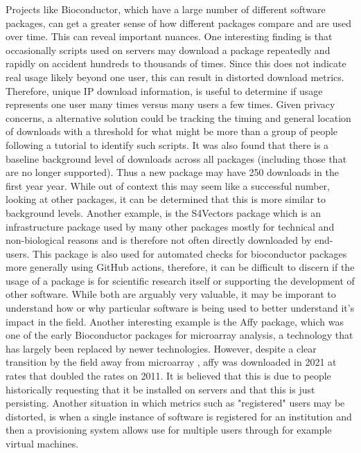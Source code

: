 \documentclass{article}
\begin{document}
Projects like Bioconductor, which have a large number of different software packages, can get a greater sense of how different packages compare and are used over time. This can reveal important nuances. One interesting finding is that occasionally scripts used on servers may download a package repeatedly and rapidly on accident hundreds to thousands of times. Since this does not indicate real usage likely beyond one user, this can result in distorted download metrics. Therefore, unique IP download information, is useful to determine if usage represents one user many times versus many users a few times. Given privacy concerns, a alternative solution could be tracking the timing and general location of downloads with a threshold for what might be more than a group of people following a tutorial to identify such scripts. It was also found that there is a baseline background level of downloads across all packages (including those that are no longer supported). Thus a new package may have 250 downloads in the first year year. While out of context this may seem like a successful number, looking at other packages, it can be determined that this is more similar to background levels. Another example, is the S4Vectors package which is an infrastructure package used by many other packages mostly for technical and non-biological reasons and is therefore not often directly downloaded by end-users. This package is also used for automated checks for bioconductor packages more generally using GitHub actions, therefore, it can be difficult to discern if the usage of a package is for scientific research itself or supporting the development of other software. While both are arguably very valuable, it may be imporant to understand how or why particular software is being used to better understand it's impact in the field.  Another interesting example is the Affy package, which was one of the early Bioconductor packages for microarray analysis, a technology that has largely been replaced by newer technologies. However, despite a clear transition by the field away from microarray \cite{mantione_comparing_2014}, affy was downloaded  in 2021 at rates that doubled the rates on 2011. It is believed that this is due to people historically requesting that it be installed on servers and that this is just persisting. Another situation in which metrics such as "registered" users may be distorted, is when a single instance of software is registered for an institution and then a provisioning system allows use for multiple users through for example virtual machines. 
\end{document}
